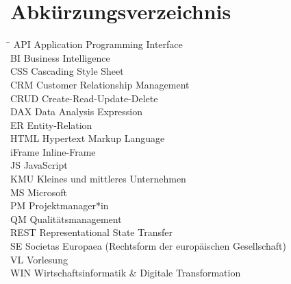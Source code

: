 \section*{Abkürzungsverzeichnis}

\begin{tabbing}
\hspace*{4cm}\=\hspace*{3cm}\= \kill
API     \> Application Programming Interface \\
BI      \> Business Intelligence \\
CSS     \> Cascading Style Sheet \\
CRM     \> Customer Relationship Management \\
CRUD    \> Create-Read-Update-Delete \\
DAX     \> Data Analysis Expression \\
ER      \> Entity-Relation \\
HTML    \> Hypertext Markup Language \\
iFrame  \> Inline-Frame \\
JS      \> JavaScript \\
KMU     \> Kleines und mittleres Unternehmen \\
MS      \> Microsoft \\
PM      \> Projektmanager*in \\
QM      \> Qualitätsmanagement \\
REST    \> Representational State Transfer \\
SE      \> Societas Europaea (Rechtsform der europäischen Gesellschaft) \\
VL      \> Vorlesung \\
WIN     \> Wirtschaftsinformatik \& Digitale Transformation

\end{tabbing}
